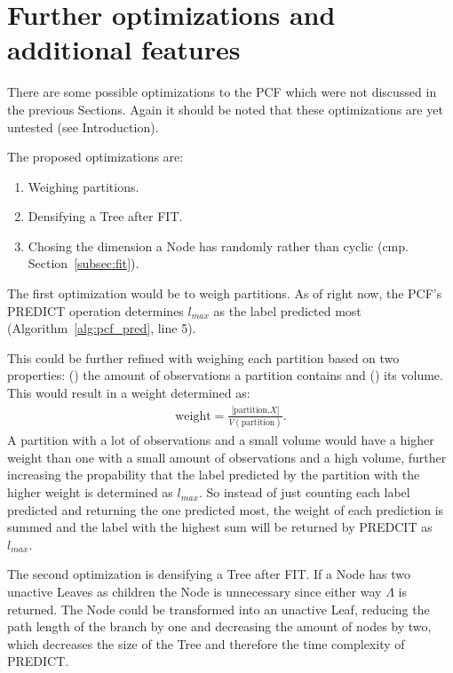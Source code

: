 \section{Further optimizations and additional features}
\label{sec:oandf}

There are some possible optimizations to the PCF which were
not discussed in the previous Sections. Again it should be
noted that these optimizations are yet untested (see
Introduction).

The proposed optimizations are:

\begin{enumerate}

  \item Weighing partitions.

  \item Densifying a Tree after FIT.

  \item Chosing the dimension a Node has randomly rather
        than cyclic (cmp. Section~\ref{subsec:fit}).

\end{enumerate}

The first optimization would be to weigh partitions. As of
right now, the PCF's PREDICT operation determines $l_{max}$
as the label predicted most (Algorithm~\ref{alg:pcf_pred},
line 5).

This could be further refined with weighing each partition
based on two properties: () the amount
of observations a partition contains and ()
its volume. This would result in a weight determined as:
\begin{align}
  \text{weight} = \frac{|\text{partition}.X|}
  {V(\text{partition})}.
\end{align}
A partition with a lot of observations and a small
volume would have a higher weight than one with a small
amount of observations and a high volume, further
increasing the propability that the label predicted by the
partition with the higher weight is determined as
$l_{max}$. So instead of just counting each label predicted
and returning the one predicted most, the weight of each
prediction is summed and the label with the highest sum
will be returned by PREDCIT as $l_{max}$.

The second optimization is densifying a Tree after FIT.
If a Node has two unactive Leaves as children the Node is
unnecessary since either way $\Lambda$ is returned. The
Node could be transformed into an unactive Leaf, reducing
the path length of the branch by one and decreasing the
amount of nodes by two, which decreases the size of the
Tree and therefore the time complexity of PREDICT.

